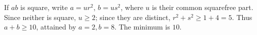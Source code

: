 If $ab$ is square, write $a=ur^2$, $b=us^2$, where $u$ is their common squarefree part. Since neither is square, $u\ge2$; since they are distinct, $r^2+s^2\ge1+4=5$. Thus $a+b\ge10$, attained by $a=2,b=8$. The minimum is $\boxed{10}$.
